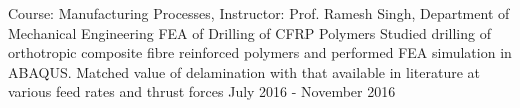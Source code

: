 \begin{cventries}



	\cventry
		{Course: Manufacturing Processes, Instructor: Prof. Ramesh Singh, Department of Mechanical Engineering}
		{FEA of Drilling of CFRP Polymers}
		{Studied drilling of orthotropic composite fibre reinforced polymers and performed FEA simulation in ABAQUS. Matched value of delamination with that available in literature at various feed rates and thrust forces}
		{July 2016 - November 2016}
		{
		}

\end{cventries}